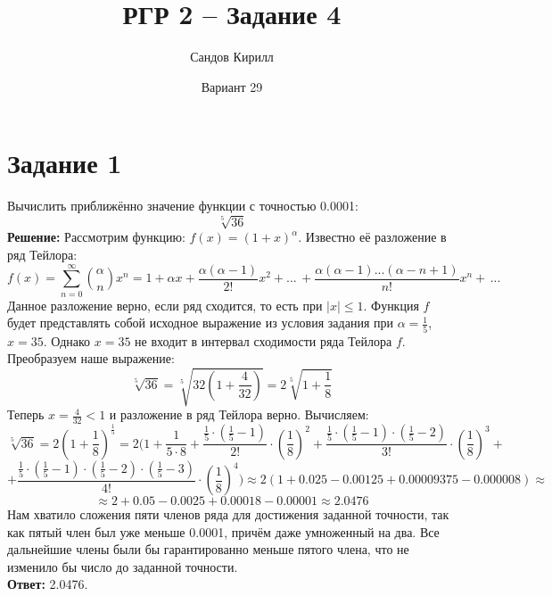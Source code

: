 \documentclass[a4paper,10pt]{article}
\title{РГР 2 -- Задание 4}
\author{Сандов Кирилл}
\date{Вариант 29}
\begin{document}
\maketitle

\section*{Задание 1}
Вычислить приближённо значение функции с точностью 0.0001:
$$
\sqrt[5]{36}
$$
\textbf{Решение:}
Рассмотрим функцию: $f(x)=(1 + x)^\alpha$. Известно её разложение в ряд Тейлора:
$$
f(x)=\sum_{n=0}^{\infty}{{\alpha \choose n}x^n}=1+\alpha x + \frac{\alpha(\alpha-1)}{2!}x^2 + ...\,+\frac{\alpha(\alpha-1)...(\alpha-n+1)}{n!}x^n +\,...
$$
Данное разложение верно, если ряд сходится, то есть при $|x|\leq1$.
Функция $f$ будет представлять собой исходное выражение из условия задания при $\alpha = \frac{1}{5}$, $x = 35$. Однако $x=35$ не входит в интервал сходимости ряда Тейлора $f$. Преобразуем наше выражение:
$$
\sqrt[5]{36} = \sqrt[5]{32(1+\frac{4}{32})} = 2\sqrt[5]{1+\frac{1}{8}}
$$
Теперь $x = \frac{4}{32} < 1$ и разложение в ряд Тейлора верно. Вычисляем:
$$
\sqrt[5]{36} = 2(1+\frac{1}{8})^\frac{1}{5} = 2(1 + \frac{1}{5\cdot8} + \frac{\frac{1}{5}\cdot(\frac{1}{5} - 1)}{2!}\cdot(\frac{1}{8})^2 + \frac{\frac{1}{5}\cdot(\frac{1}{5} - 1)\cdot(\frac{1}{5} - 2)}{3!}\cdot(\frac{1}{8})^3 +
$$
$$
+ \frac{\frac{1}{5}\cdot(\frac{1}{5} - 1)\cdot(\frac{1}{5} - 2)\cdot(\frac{1}{5} - 3)}{4!}\cdot(\frac{1}{8})^4) \approx 2(1 + 0.025 - 0.00125 + 0.00009375 - 0.000008) \approx
$$
$$
\approx 2 + 0.05 - 0.0025 + 0.00018 - 0.00001 \approx 2.0476
$$
Нам хватило сложения пяти членов ряда для достижения заданной точности, так как пятый член был уже меньше 0.0001, причём даже умноженный на два. Все дальнейшие члены были бы гарантированно меньше пятого члена, что не изменило бы число до заданной точности.
\\
\textbf{Ответ:} 2.0476.
\end{document}

